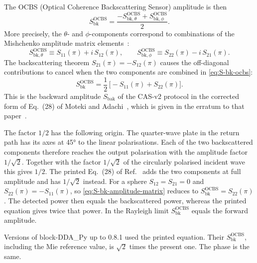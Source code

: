 \documentclass[11pt,a4paper]{article}
\begin{document}
The OCBS (Optical Coherence Backscattering Sensor) amplitude is then
\begin{equation}
  S_{\text{bk}}^{\text{OCBS}}
    = \frac{-S_{\text{bk},\theta}^{\text{OCBS}}
            + S_{\text{bk},\phi}^{\text{OCBS}}}{2}.
  \label{eq:S-bk-ocbs}
\end{equation}
More precisely, the $\theta$- and $\phi$-components correspond to
combinations of the Mishchenko amplitude matrix
elements~\cite{Mishchenko2002}:
\begin{equation}
  S_{\text{bk},\theta}^{\text{OCBS}}
    \equiv S_{11}(\pi) + i\,S_{12}(\pi),
  \qquad
  S_{\text{bk},\phi}^{\text{OCBS}}
    \equiv S_{22}(\pi) - i\,S_{21}(\pi).
  \label{eq:S-bk-mishchenko}
\end{equation}
The backscattering theorem $S_{21}(\pi) = -S_{12}(\pi)$ causes the
off-diagonal contributions to cancel when the two components are
combined in \eqref{eq:S-bk-ocbs}:
\begin{equation}
  S_{\text{bk}}^{\text{OCBS}}
    = \frac{1}{2}\,\bigl[-S_{11}(\pi) + S_{22}(\pi)\bigr].
  \label{eq:S-bk-amplitude-matrix}
\end{equation}
This is the backward amplitude $S_{\text{bak}}$ of the CAS-v2 protocol in
the corrected form of Eq.~(28) of Moteki and
Adachi~\cite{Moteki2024}, which is given in the erratum to that
paper~\cite{Moteki2024Erratum}.

The factor $1/2$ has the following origin.
The quarter-wave plate in the return path has its axes at \ang{45} to
the linear polarisations.
Each of the two backscattered components therefore reaches the output
polarisation with the amplitude factor $1/\sqrt{2}$.
Together with the factor $1/\sqrt{2}$ of the circularly polarised
incident wave this gives $1/2$.
The printed Eq.~(28) of Ref.~\cite{Moteki2024} adds the two components
at full amplitude and has $1/\sqrt{2}$ instead.
For a sphere $S_{12} = S_{21} = 0$ and $S_{22}(\pi) = -S_{11}(\pi)$,
so \eqref{eq:S-bk-amplitude-matrix} reduces to
$S_{\text{bk}}^{\text{OCBS}} = S_{22}(\pi)$.
The detected power then equals the backscattered power, whereas the
printed equation gives twice that power.
In the Rayleigh limit $S_{\text{bk}}^{\text{OCBS}}$ equals the forward
amplitude.

Versions of block-DDA\_Py up to 0.8.1 used the printed equation.
Their $S_{\text{bk}}^{\text{OCBS}}$, including the Mie reference value,
is $\sqrt{2}$ times the present one.
The phase is the same.

\end{document}
